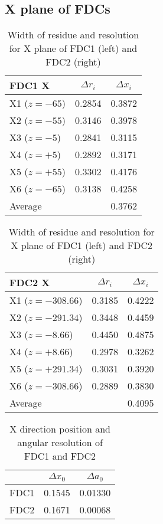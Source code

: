 \subsection{X plane of FDCs}
\begin{table}[h]
    \centering
\begin{tabular}{l|cc}
    \hline
    FDC1 X & $\Delta r_i$ & $\Delta x_i$ \\
    \hline 
    X1 ($z=-65$) &  0.2854 & 0.3872      \\
    X2 ($z=-55$) &  0.3146 & 0.3978      \\
    X3 ($z=-5$)  &  0.2841 & 0.3115      \\
    X4 ($z=+5$)  &  0.2892 & 0.3171      \\
    X5 ($z=+55$) &  0.3302 & 0.4176      \\
    X6 ($z=-65$) &  0.3138 & 0.4258      \\
    \hline
    Average & & 0.3762 \\
    \hline
\end{tabular}
\begin{tabular}{l|cc}
    \hline
    FDC2 X & $\Delta r_i$ & $\Delta x_i$ \\
    \hline 
    X1 ($z=-308.66$) &  0.3185 & 0.4222      \\
    X2 ($z=-291.34$) &  0.3448 & 0.4459      \\
    X3 ($z=-8.66$)   &  0.4450 & 0.4875      \\
    X4 ($z=+8.66$)   &  0.2978 & 0.3262      \\
    X5 ($z=+291.34$) &  0.3031 & 0.3920      \\
    X6 ($z=-308.66$) &  0.2889 & 0.3830      \\
    \hline
    Average & & 0.4095\\
    \hline
\end{tabular}
\caption{Width of residue and resolution for X plane of FDC1 (left) and FDC2 (right)}
\end{table}

\begin{table}[h]
    \centering
    \begin{tabular}{c|cc}
        \hline
            & $\Delta x_0$ & $\Delta a_0$ \\
            \hline
            FDC1 & 0.1545 & 0.01330 \\
            FDC2 & 0.1671 & 0.00068 \\
            \hline
    \end{tabular}
    \caption{X direction position and angular resolution of FDC1 and FDC2}
\end{table}

